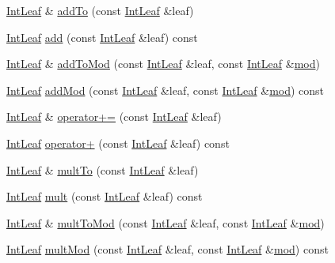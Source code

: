 \begin{DoxyCompactItemize}
\item 
\hyperlink{class_int_leaf}{Int\-Leaf} \& \hyperlink{class_int_leaf_aa01577692f0e8ae228ecd269f81d7f1c}{add\-To} (const \hyperlink{class_int_leaf}{Int\-Leaf} \&leaf)
\item 
\hyperlink{class_int_leaf}{Int\-Leaf} \hyperlink{class_int_leaf_abb3c9fbe230ea366d6bc535c0bdec914}{add} (const \hyperlink{class_int_leaf}{Int\-Leaf} \&leaf) const 
\item 
\hyperlink{class_int_leaf}{Int\-Leaf} \& \hyperlink{class_int_leaf_ac41a9c6bd62f3e1bb8e9befcaf6d4675}{add\-To\-Mod} (const \hyperlink{class_int_leaf}{Int\-Leaf} \&leaf, const \hyperlink{class_int_leaf}{Int\-Leaf} \&\hyperlink{class_int_leaf_a4e645145141d0f8ded8afdd2c6aa7228}{mod})
\item 
\hyperlink{class_int_leaf}{Int\-Leaf} \hyperlink{class_int_leaf_a18fdf94a11a9cc1c27d5fd35449a1ae3}{add\-Mod} (const \hyperlink{class_int_leaf}{Int\-Leaf} \&leaf, const \hyperlink{class_int_leaf}{Int\-Leaf} \&\hyperlink{class_int_leaf_a4e645145141d0f8ded8afdd2c6aa7228}{mod}) const 
\item 
\hyperlink{class_int_leaf}{Int\-Leaf} \& \hyperlink{class_int_leaf_ac3832b8f8dbabb25c182cffd7a1cf848}{operator+=} (const \hyperlink{class_int_leaf}{Int\-Leaf} \&leaf)
\item 
\hyperlink{class_int_leaf}{Int\-Leaf} \hyperlink{class_int_leaf_abac0513d6fad2231b96f8af527d5762e}{operator+} (const \hyperlink{class_int_leaf}{Int\-Leaf} \&leaf) const 
\item 
\hyperlink{class_int_leaf}{Int\-Leaf} \& \hyperlink{class_int_leaf_a977132f0c126e46eaad34ed93c683727}{mult\-To} (const \hyperlink{class_int_leaf}{Int\-Leaf} \&leaf)
\item 
\hyperlink{class_int_leaf}{Int\-Leaf} \hyperlink{class_int_leaf_ad4635cd5bc4fddb9e4db5ebfc523e33f}{mult} (const \hyperlink{class_int_leaf}{Int\-Leaf} \&leaf) const 
\item 
\hyperlink{class_int_leaf}{Int\-Leaf} \& \hyperlink{class_int_leaf_a5f893aa4d1954a0c273f02413a662ca5}{mult\-To\-Mod} (const \hyperlink{class_int_leaf}{Int\-Leaf} \&leaf, const \hyperlink{class_int_leaf}{Int\-Leaf} \&\hyperlink{class_int_leaf_a4e645145141d0f8ded8afdd2c6aa7228}{mod})
\item 
\hyperlink{class_int_leaf}{Int\-Leaf} \hyperlink{class_int_leaf_a1d24e8b786d5736c637a24ea5d90ef0d}{mult\-Mod} (const \hyperlink{class_int_leaf}{Int\-Leaf} \&leaf, const \hyperlink{class_int_leaf}{Int\-Leaf} \&\hyperlink{class_int_leaf_a4e645145141d0f8ded8afdd2c6aa7228}{mod}) const 
\item 

\end{DoxyCompactItemize}
